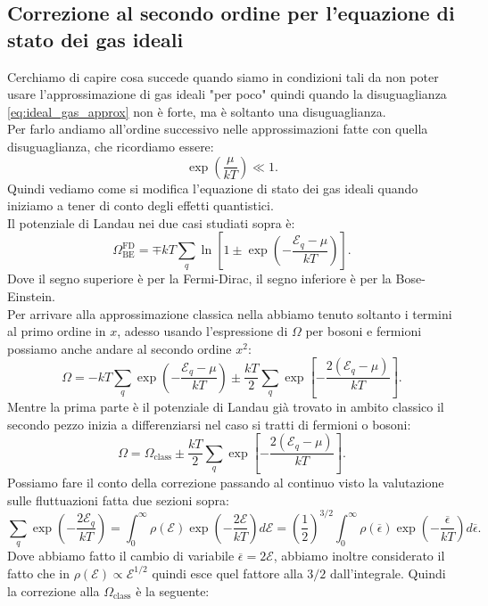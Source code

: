 \subsection{Correzione al secondo ordine per l'equazione di stato dei gas ideali}%
Cerchiamo di capire cosa succede quando siamo in condizioni tali da non poter usare l'approssimazione di gas ideali "per poco" quindi quando la disuguaglianza \ref{eq:ideal_gas_approx} non è forte, ma è soltanto una disuguaglianza.\\ 
Per farlo andiamo all'ordine successivo nelle approssimazioni fatte con quella disuguaglianza, che ricordiamo essere:
\[
	\exp\left( \frac{\mu }{kT} \right) \ll 1
.\] 
Quindi vediamo come si modifica l'equazione di stato dei gas ideali quando iniziamo a tener di conto degli effetti quantistici.\\
Il potenziale di Landau nei due casi studiati sopra è:
\[
	\Omega^{\text{FD}}_{\text{BE}} = \mp kT \sum_{q}^{} \ln\left[ 1 \pm \exp\left( - \frac{\mathcal{E} _{q}-\mu }{kT} \right)  \right] 
.\] 
Dove il segno superiore è per la Fermi-Dirac, il segno inferiore è per la Bose-Einstein.\\
Per arrivare alla approssimazione classica nella abbiamo tenuto soltanto i termini al primo ordine in $x$, adesso usando l'espressione di $\Omega$ per bosoni e fermioni possiamo anche andare al secondo ordine $x^2$:
\[
	\Omega = -kT \sum_{q}^{} \exp\left( - \frac{\mathcal{E} _{q}-\mu }{kT} \right) \pm \frac{kT}{2}\sum_{q}^{} \exp\left[ - \frac{2 \left( \mathcal{E} _{q}-\mu  \right) }{kT} \right] 
.\]
Mentre la prima parte è il potenziale di Landau già trovato in ambito classico il secondo pezzo inizia a differenziarsi nel caso si tratti di fermioni o bosoni:
\[
	\Omega = \Omega _{\text{class}} \pm \frac{kT}{2}\sum_{q}^{} \exp\left[ - \frac{2 \left( \mathcal{E} _{q}-\mu  \right) }{kT} \right] 
.\]
Possiamo fare il conto della correzione passando al continuo visto la valutazione sulle fluttuazioni fatta due sezioni sopra:
\[
	\sum_{q}^{} \exp\left( -\frac{2\mathcal{E} _{q}}{kT} \right) = \int_{0}^{\infty}  \rho ( \mathcal{E} ) \exp\left( - \frac{2\mathcal{E} }{kT} \right) d\mathcal{E} =
	\left( \frac{1}{2} \right) ^{3 /2}\int_{0}^{\infty} \rho ( \overline{\epsilon }) \exp\left( - \frac{\overline{\epsilon }}{kT} \right) d \overline{\epsilon } 
.\] 
Dove abbiamo fatto il cambio di variabile $\overline{\epsilon }= 2\mathcal{E} $, abbiamo inoltre considerato il fatto che in $\rho ( \mathcal{E} ) \propto \mathcal{E} ^{1 /2}$ quindi esce quel fattore alla $3 /2$ dall'integrale.
Quindi la correzione alla $\Omega _{\text{class}}$ è la seguente:
